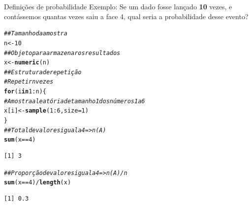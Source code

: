 \documentclass[10pt]{beamer}\usepackage[]{graphicx}\usepackage[]{color}
\makeatletter
\newcommand{\hlnum}[1]{\textcolor[rgb]{0.686,0.059,0.569}{#1}}%
\newcommand{\hlcom}[1]{\textcolor[rgb]{0.678,0.584,0.686}{\textit{#1}}}%
\newcommand{\hlopt}[1]{\textcolor[rgb]{0,0,0}{#1}}%
\newcommand{\hlstd}[1]{\textcolor[rgb]{0.345,0.345,0.345}{#1}}%
\newcommand{\hlkwa}[1]{\textcolor[rgb]{0.161,0.373,0.58}{\textbf{#1}}}%
\newcommand{\hlkwb}[1]{\textcolor[rgb]{0.69,0.353,0.396}{#1}}%
\newcommand{\hlkwc}[1]{\textcolor[rgb]{0.333,0.667,0.333}{#1}}%
\newcommand{\hlkwd}[1]{\textcolor[rgb]{0.737,0.353,0.396}{\textbf{#1}}}%
\newenvironment{kframe}{%
 \def\at@end@of@kframe{}%
 \ifinner\ifhmode%
  \def\at@end@of@kframe{\end{minipage}}%
  \begin{minipage}{\columnwidth}%
 \fi\fi%
 \def\FrameCommand##1{\hskip\@totalleftmargin \hskip-\fboxsep
 \colorbox{shadecolor}{##1}\hskip-\fboxsep
     \hskip-\linewidth \hskip-\@totalleftmargin \hskip\columnwidth}%
 \MakeFramed {\advance\hsize-\width
   \@totalleftmargin\z@ \linewidth\hsize
   \@setminipage}}%
 {\par\unskip\endMakeFramed%
 \at@end@of@kframe}
\newenvironment{knitrout}{}{} %
\theoremstyle{definition}
\makeatother
\begin{document}
\begin{frame}[fragile]{Definições de probabilidade}
  Exemplo: Se um dado fosse lançado \textbf{10} vezes, e contássemos
  quantas vezes saiu a face 4, qual seria a probabilidade desse evento?
\begin{knitrout}\footnotesize
{}\color{fgcolor}\begin{kframe}
\begin{alltt}
\hlcom{## Tamanho da amostra}
\hlstd{n} \hlkwb{<-} \hlnum{10}
\hlcom{## Objeto para armazenar os resultados}
\hlstd{x} \hlkwb{<-} \hlkwd{numeric}\hlstd{(n)}
\hlcom{## Estrutura de repetição}
\hlcom{# Repetir n vezes}
\hlkwa{for}\hlstd{(i} \hlkwa{in} \hlnum{1}\hlopt{:}\hlstd{n)\{}
    \hlcom{# Amostra aleatória de tamanho 1 dos números 1 a 6}
    \hlstd{x[i]} \hlkwb{<-} \hlkwd{sample}\hlstd{(}\hlnum{1}\hlopt{:}\hlnum{6}\hlstd{,} \hlkwc{size} \hlstd{=} \hlnum{1}\hlstd{)}
\hlstd{\}}
\hlcom{## Total de valores igual a 4 => n(A)}
\hlkwd{sum}\hlstd{(x} \hlopt{==} \hlnum{4}\hlstd{)}
\end{alltt}
\begin{verbatim}
[1] 3
\end{verbatim}
\begin{alltt}
\hlcom{## Proporção de valores igual a 4 => n(A)/n}
\hlkwd{sum}\hlstd{(x} \hlopt{==} \hlnum{4}\hlstd{)}\hlopt{/}\hlkwd{length}\hlstd{(x)}
\end{alltt}
\begin{verbatim}
[1] 0.3
\end{verbatim}
\end{kframe}
\end{knitrout}
\end{frame}
\end{document}
